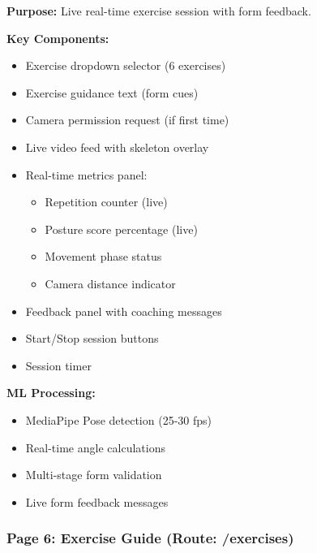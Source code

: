\documentclass[12pt,a4paper]{article}
\begin{document}
\textbf{Purpose:} Live real-time exercise session with form feedback.

\textbf{Key Components:}
\begin{itemize}[noitemsep, topsep=2pt]
  \item Exercise dropdown selector (6 exercises)
  \item Exercise guidance text (form cues)
  \item Camera permission request (if first time)
  \item Live video feed with skeleton overlay
  \item Real-time metrics panel:
    \begin{itemize}[noitemsep, topsep=0pt]
      \item Repetition counter (live)
      \item Posture score percentage (live)
      \item Movement phase status
      \item Camera distance indicator
    \end{itemize}
  \item Feedback panel with coaching messages
  \item Start/Stop session buttons
  \item Session timer
\end{itemize}

\textbf{ML Processing:}
\begin{itemize}[noitemsep, topsep=2pt]
  \item MediaPipe Pose detection (25-30 fps)
  \item Real-time angle calculations
  \item Multi-stage form validation
  \item Live form feedback messages
\end{itemize}

\vspace{0.5cm}
\noindent{}
\vspace{1cm}


\subsubsection*{Page 6: Exercise Guide (Route: /exercises)}
\end{document}
